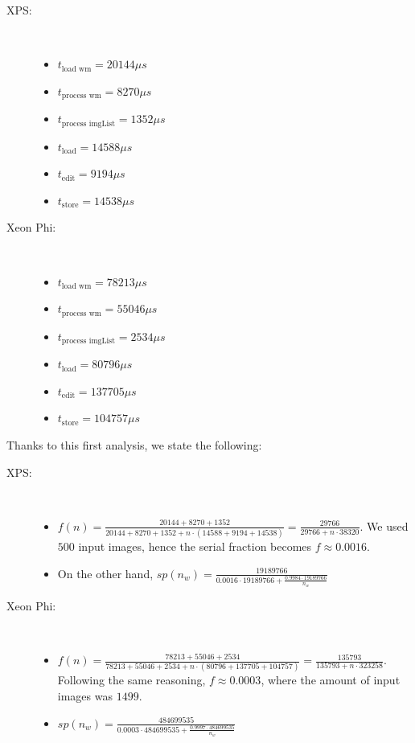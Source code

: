 \documentclass[12pt,a4paper,english]{article}
\begin{document}
\begin{description}
  \item[{\sc XPS:}] ~\\
    \begin{itemize}
      \item $t_{\text{load wm}} = 20144 \mu s$
      \item $t_{\text{process wm}} = 8270 \mu s$
      \item $t_{\text{process imgList}} = 1352 \mu s$
      \item $t_{\text{load}} = 14588 \mu s$
      \item $t_{\text{edit}} = 9194 \mu s$
      \item $t_{\text{store}} = 14538 \mu s$
      \end{itemize}
  \item[{\sc Xeon Phi:}]~\\
    \begin{itemize}
      \item $t_{\text{load wm}} = 78213 \mu s$
      \item $t_{\text{process wm}} = 55046 \mu s$
      \item $t_{\text{process imgList}} = 2534 \mu s$
      \item $t_{\text{load}} = 80796 \mu s$
      \item $t_{\text{edit}} = 137705 \mu s$
      \item $t_{\text{store}} = 104757 \mu s$
      \end{itemize}
\end{description}


Thanks to this first analysis, we state the following:

\begin{description}
  \item[{\sc XPS:}] ~\\
    \begin{itemize}
      \item $f(n) = \frac{20144 + 8270 + 1352}{20144 + 8270 + 1352 + n \cdot (14588 + 9194 + 14538)} = \frac{29766}{29766 + n \cdot 38320}$. We used $500$ input images, hence the serial fraction becomes $f \approx 0.0016$. 
      \item On the other hand, $sp(n_w) = \frac{19189766}{0.0016 \cdot 19189766 + \frac{0.9984 \cdot 19189766}{n_w}}  $
    \end{itemize}
  \item[{\sc Xeon Phi:}] ~\\
    \begin{itemize}
      \item $f(n) = \frac{78213 + 55046 + 2534}{78213 + 55046 + 2534 + n \cdot (80796 + 137705 + 104757)} = \frac{135793}{135793 + n \cdot 323258}$. Following the same reasoning, $f \approx 0.0003$, where the amount of input images was $1499$.
      \item $sp(n_w) = \frac{484699535}{0.0003 \cdot 484699535 + \frac{0.9997 \cdot 484699535}{n_w}}$
    \end{itemize}

     \end{description}
\end{document}

